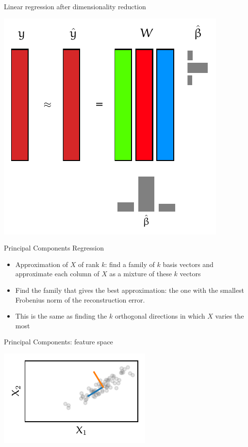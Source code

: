 \documentclass[presentation,mathserif,table]{beamer}
\begin{document}
\begin{frame}[label={sec:orgbe42187}]{Linear regression after dimensionality reduction}
\begin{center}
\includegraphics[height=.7\textheight]{figures/generated/dim_reduction_colors/regression_reduced_3.pdf}
\end{center}
\end{frame}
\begin{frame}[label={sec:org0b29c9d}]{Principal Components Regression}
\begin{itemize}
\item Approximation of \(X\) of rank \(k\): find a family of \(k\) basis vectors and approximate each column of \(X\) as a mixture of these \(k\) vectors
\item Find the family that gives the best approximation: the one with the smallest Frobenius norm of the reconstruction error.
\item This is the same as finding the \(k\) orthogonal directions in which \(X\) varies the most
\end{itemize}
\end{frame}

\begin{frame}[label={sec:org4f2bf7e}]{Principal Components: feature space}
\begin{center}
\includegraphics[height=.3\textheight]{figures/generated/pca/cloud_not_aligned_with_pc.pdf}
\end{center}
\end{frame}
\end{document}
